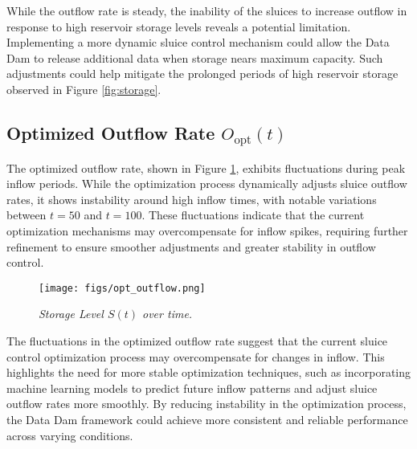 While the outflow rate is steady, the inability of the sluices to increase outflow in response to high reservoir storage levels reveals a potential limitation. Implementing a more dynamic sluice control mechanism could allow the Data Dam to release additional data when storage nears maximum capacity. Such adjustments could help mitigate the prolonged periods of high reservoir storage observed in Figure \ref{fig:storage}.

\subsection{Optimized Outflow Rate \( O_{\text{opt}}(t) \)}
The optimized outflow rate, shown in Figure \ref{fig:opt_outflow}, exhibits fluctuations during peak inflow periods. While the optimization process dynamically adjusts sluice outflow rates, it shows instability around high inflow times, with notable variations between \( t = 50 \) and \( t = 100 \). These fluctuations indicate that the current optimization mechanisms may overcompensate for inflow spikes, requiring further refinement to ensure smoother adjustments and greater stability in outflow control.

\begin{figure}[H] %
    \centering
        \texttt{[image: figs/opt\_outflow.png]} %
        \caption{\textit{Storage Level \( S(t) \) over time.}} %
        \label{fig:opt_outflow}
 
\end{figure}

The fluctuations in the optimized outflow rate suggest that the current sluice control optimization process may overcompensate for changes in inflow. This highlights the need for more stable optimization techniques, such as incorporating machine learning models to predict future inflow patterns and adjust sluice outflow rates more smoothly. By reducing instability in the optimization process, the Data Dam framework could achieve more consistent and reliable performance across varying conditions.

